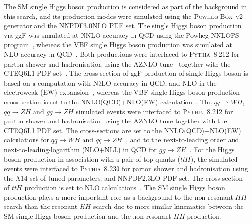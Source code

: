 The SM single Higgs boson production 
is considered as part of
the background in this search, 
and its production modes were simulated using the
\textsc{Powheg-Box~v2} generator and the 
\textsc{NNPDF3.0NLO} PDF set.
The single Higgs boson production via ggF was simulated at 
NNLO accuracy in QCD using the
Powheg NNLOPS program~\cite{Hamilton:2013fea,Hamilton:2015nsa},
whereas the VBF single Higgs boson production was simulated at 
NLO accuracy in QCD~\cite{Nason:2009ai}.
Both productions were interfaced to \textsc{Pythia~8.212} 
for parton shower and hadronisation
using the 
AZNLO tune~\cite{AZNLOtune} together with the 
\textsc{CTEQ6L1} PDF set~\cite{CTEQ6L1}.
The cross-section of ggF production of single Higgs boson 
is based on a computation with
N3LO accuracy in QCD, and 
NLO in the electroweak (EW)
expansion~\cite{deFlorian:2016spz,Anastasiou:2016cez,Anastasiou:2015ema,Dulat:2018rbf,Actis:2008ug},
whereas the 
VBF single Higgs boson production cross-section 
is set to the NNLO(QCD)+NLO(EW)
calculation~\cite{deFlorian:2016spz,Ciccolini:2007jr,Ciccolini:2007ec,Bolzoni:2010xr}.
The $qq \rightarrow WH$, $qq \rightarrow ZH$ and $gg \rightarrow ZH$ simulated events
were interfaced to \textsc{Pythia~8.212} for parton shower
and hadronisation using the AZNLO tune together with the
\textsc{CTEQ6L1} PDF set.
The cross-sections are set to the NNLO(QCD)+NLO(EW) calculations for
$qq \rightarrow WH$ and 
$qq \rightarrow ZH$~\cite{Ciccolini:2003jy,Brein:2003wg,Ferrera:2011bk,Brein:2011vx,Ferrera:2013yga,Ferrera:2014lca,Campbell:2016jau},
and to the next-to-leading order and next-to-leading-logarithm (NLO+NLL) in QCD for
$gg \rightarrow ZH$~\cite{Altenkamp:2012sx,Hespel:2015zea,ggzhnll,Harlander:2013mla,Brein:2012ne}.
For the Higgs boson production in association with a pair of top-quarks 
($t\bar{t}H$),
the simulated events were interfaced to 
\textsc{Pythia~8.230} for parton shower
and hadronisation using the 
A14 set of tuned parameters, and 
\textsc{NNPDF2.3LO} PDF set.
The cross-section of $t\bar{t}H$ production is set to 
NLO calculations~\cite{deFlorian:2016spz}.
The SM single Higgs boson production plays a more important role as a background
to the non-resonant $HH$ search than the resonant $HH$ search due to more
similar kinematics between the SM single Higgs boson production and
the non-resonant $HH$ production.